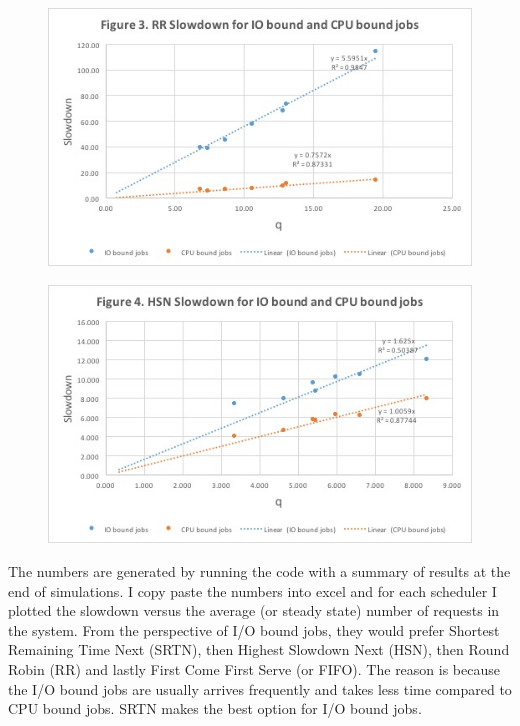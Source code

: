 \documentclass{article}   	                         %
\begin{document}
\begin{figure}
\centering
\begin{minipage}{.5\textwidth}
  \centering
  \includegraphics[width=\linewidth]{Picture3.jpg}
  \label{fig:RR}
\end{minipage}%
\begin{minipage}{.5\textwidth}
  \centering
  \includegraphics[width=\linewidth]{Picture4.jpg}
  \label{fig:HSN}
\end{minipage}
\end{figure}

The numbers are generated by running the code with a summary of results at the end of simulations. I copy paste the numbers into excel and for each scheduler I plotted the slowdown versus the average (or steady state) number of requests in the system. From the perspective of  I/O bound jobs, they would prefer Shortest Remaining Time Next (SRTN), then Highest Slowdown Next (HSN), then Round Robin (RR) and lastly First Come First Serve (or FIFO). The reason is because the I/O bound jobs are usually arrives frequently and takes less time compared to CPU bound jobs. SRTN makes the best option for I/O bound jobs.
\end{document}
